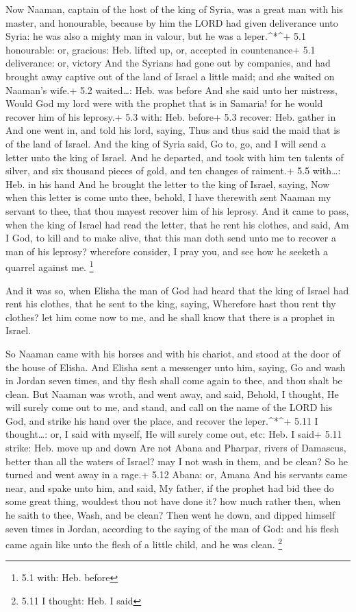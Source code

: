  Now Naaman, captain of the host of the king of Syria, was a
great man with his master, and honourable, because by him the LORD had
given deliverance unto Syria: he was also a mighty man in valour, but he
was a leper.\^{}*\^{}+ 5.1 honourable: or, gracious: Heb. lifted up, or,
accepted in countenance+ 5.1 deliverance: or, victory  And
the Syrians had gone out by companies, and had brought away captive out
of the land of Israel a little maid; and she waited on Naaman's wife.+
5.2 waited\ldots: Heb. was before  And she said unto her
mistress, Would God my lord were with the prophet that is in Samaria!
for he would recover him of his leprosy.+ 5.3 with: Heb. before+ 5.3
recover: Heb. gather in  And one went in, and told his lord,
saying, Thus and thus said the maid that is of the land of Israel.
 And the king of Syria said, Go to, go, and I will send a
letter unto the king of Israel. And he departed, and took with him ten
talents of silver, and six thousand pieces of gold, and ten changes of
raiment.+ 5.5 with\ldots: Heb. in his hand  And he brought
the letter to the king of Israel, saying, Now when this letter is come
unto thee, behold, I have therewith sent Naaman my servant to thee, that
thou mayest recover him of his leprosy.  And it came to
pass, when the king of Israel had read the letter, that he rent his
clothes, and said, Am I God, to kill and to make alive, that this man
doth send unto me to recover a man of his leprosy? wherefore consider, I
pray you, and see how he seeketh a quarrel against me. \footnote{5.1
  with: Heb. before}

 And it was so, when Elisha the man of God had heard that
the king of Israel had rent his clothes, that he sent to the king,
saying, Wherefore hast thou rent thy clothes? let him come now to me,
and he shall know that there is a prophet in Israel.

 So Naaman came with his horses and with his chariot, and
stood at the door of the house of Elisha.  And Elisha sent
a messenger unto him, saying, Go and wash in Jordan seven times, and thy
flesh shall come again to thee, and thou shalt be clean. 
But Naaman was wroth, and went away, and said, Behold, I thought, He
will surely come out to me, and stand, and call on the name of the LORD
his God, and strike his hand over the place, and recover the
leper.\^{}*\^{}+ 5.11 I thought\ldots: or, I said with myself, He will
surely come out, etc: Heb. I said+ 5.11 strike: Heb. move up and down
 Are not Abana and Pharpar, rivers of Damascus, better than
all the waters of Israel? may I not wash in them, and be clean? So he
turned and went away in a rage.+ 5.12 Abana: or, Amana  And
his servants came near, and spake unto him, and said, My father, if the
prophet had bid thee do some great thing, wouldest thou not have done
it? how much rather then, when he saith to thee, Wash, and be clean?
 Then went he down, and dipped himself seven times in
Jordan, according to the saying of the man of God: and his flesh came
again like unto the flesh of a little child, and he was clean.
\footnote{5.11 I thought: Heb. I said}

